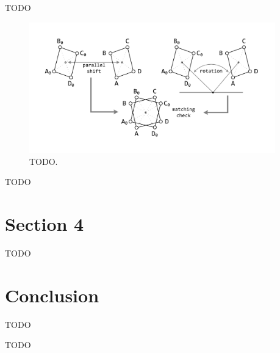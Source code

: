 \documentclass[
11pt,%
tightenlines,%
twoside,%
onecolumn,%
nofloats,%
nobibnotes,%
nofootinbib,%
superscriptaddress,%
noshowpacs,%
centertags]%
{revtex4}
\begin{document}
TODO

\begin{figure}[h]
\setcaptionmargin{5mm}
\onelinecaptionstrue
\includegraphics[width=0.95\textwidth]{pics/match3.pdf}
\caption{TODO.}
\label{fig:match3}
\end{figure}

TODO
        
\section{Section 4}

TODO

\section{Conclusion}

TODO

\begin{acknowledgments}
TODO
\end{acknowledgments}

\begin{thebibliography}{99}


\end{thebibliography}
\end{document}
